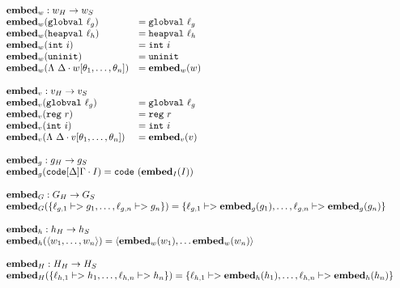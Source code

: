 {\footnotesize
\[\begin{array}{l}
\begin{array}{ll}
\rlap{$\embed_w : \high w -> \simple{w}$} \\
\embed_w(\mathtt{globval}\ \ell_g) &= \mathtt{globval}\ \ell_g \\
\embed_w(\mathtt{heapval}\ \ell_h) &= \mathtt{heapval}\ \ell_h \\
\embed_w(\mathtt{int}\ i) &= \mathtt{int}\ i \\
\embed_w(\mathtt{uninit}) &= \mathtt{uninit} \\
\embed_w(\Lambda\ \Delta \cdot w[\theta_1, \dots, \theta_n]) &= \embed_w(w) \\\\

\rlap{$\embed_v : \high v -> \simple{v}$} \\
\embed_v(\mathtt{globval}\ \ell_g) &= \mathtt{globval}\ \ell_g \\
\embed_v(\mathtt{reg}\ r) &= \mathtt{reg}\ r \\
\embed_v(\mathtt{int}\ i) &= \mathtt{int}\ i \\
\embed_v(\Lambda\ \Delta \cdot v[\theta_1, \dots, \theta_n]) &= \embed_v(v)
\end{array} \\\\

\begin{array}{l}
\embed_g : \high g -> \simple{g} \\
\embed_g(\mathtt{code}[\Delta]\Gamma \cdot I) = \mathtt{code}\ (\embed_I(I)) \\\\

\embed_G : \high G -> \simple{G} \\
\embed_G(\{\ell_{g,1} |-> g_1, \dots, \ell_{g,n} |-> g_n\}) = \{\ell_{g,1} |-> \embed_g(g_1), \dots, \ell_{g,n} |-> \embed_g(g_n)\} \\\\

\embed_h : \high h -> \simple{h} \\
\embed_h(\langle w_1, \dots, w_n \rangle) = \langle \embed_w(w_1), \dots \embed_w(w_n)\rangle \\\\

\embed_H : \high H -> \simple{H} \\
\embed_H(\{\ell_{h,1} |-> h_1, \dots, \ell_{h,n} |-> h_n\}) = \{\ell_{h,1} |-> \embed_h(h_1), \dots, \ell_{h,n} |-> \embed_h(h_n)\}
\end{array} \\\\


\end{array}\]}
